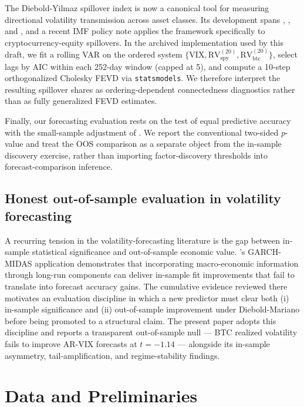 \documentclass[11pt,a4paper]{article}
\begin{document}
The Diebold-Yilmaz spillover index is now a canonical tool for measuring directional volatility transmission across asset classes. Its development spans \citet{diebold2009}, \citet{diebold2012}, and \citet{diebold2014network}, and a recent IMF policy note \citep{iyer2022} applies the framework specifically to cryptocurrency-equity spillovers. In the archived implementation used by this draft, we fit a rolling VAR on the ordered system $\{\text{VIX}, \text{RV}^{(20)}_{\text{spy}}, \text{RV}^{(20)}_{\text{btc}}\}$, select lags by AIC within each 252-day window (capped at 5), and compute a 10-step orthogonalized Cholesky FEVD via \texttt{statsmodels}. We therefore interpret the resulting spillover shares as ordering-dependent connectedness diagnostics rather than as fully generalized FEVD estimates.

Finally, our forecasting evaluation rests on the \citet{diebold1995} test of equal predictive accuracy with the small-sample adjustment of \citet{harvey1997}. We report the conventional two-sided $p$-value and treat the OOS comparison as a separate object from the in-sample discovery exercise, rather than importing factor-discovery thresholds into forecast-comparison inference.

\subsection{Honest out-of-sample evaluation in volatility forecasting}

A recurring tension in the volatility-forecasting literature is the gap between in-sample statistical significance and out-of-sample economic value. \citet{conrad2020}'s GARCH-MIDAS application demonstrates that incorporating macro-economic information through long-run components can deliver in-sample fit improvements that fail to translate into forecast accuracy gains. The cumulative evidence reviewed there motivates an evaluation discipline in which a new predictor must clear both (i) in-sample significance and (ii) out-of-sample improvement under Diebold-Mariano before being promoted to a structural claim. The present paper adopts this discipline and reports a transparent out-of-sample null --- BTC realized volatility fails to improve AR-VIX forecasts at $t = -1.14$ --- alongside its in-sample asymmetry, tail-amplification, and regime-stability findings.

\section{Data and Preliminaries}
\label{sec:data}
\end{document}
